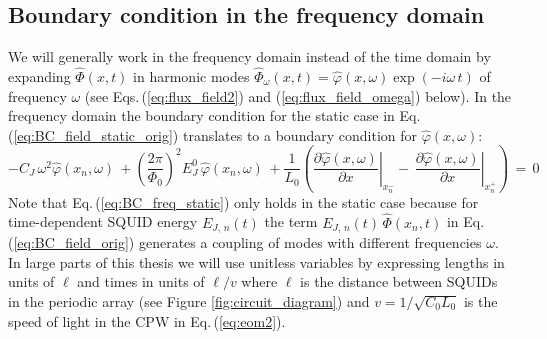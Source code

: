 \subsection{Boundary condition in the frequency domain}\label{sec:BC_in_frequency_domain}
%
\noindent
We will generally work in the frequency domain instead of the time domain by 
expanding $\hat{\Phi}(x, t)$ in harmonic modes 
$\hat{\Phi}_{\omega}(x, t) = \hat{\varphi}(x,\omega) \exp(- i \omega \, t)$ of frequency $\omega$
(see Eqs.\,(\ref{eq:flux_field2}) and (\ref{eq:flux_field_omega}) below).
In the frequency domain the boundary condition for the static case in Eq.\,(\ref{eq:BC_field_static_orig}) 
translates to a boundary condition for $\hat{\varphi}(x,\omega)$:
%
\begin{equation}\label{eq:BC_freq_static}
- C_{J} \, \omega^2 \hat{\varphi}(x_n, \omega) \, + 
\left(\frac{2 \pi}{\Phi_{0}}\right)^{2} E_J^0 \, \hat{\varphi}(x_n, \omega) \, + 
\frac{1}{L_{0}}\left(\left.\frac{\partial \hat{\varphi}(x, \omega)}{\partial x}\right|_{x_n^{-}}
- \, \left.\frac{\partial \hat{\varphi}(x,\omega)}{\partial x}\right|_{x_n^{+}}\right) \, = \, 0
\end{equation}
%
Note that Eq.\,(\ref{eq:BC_freq_static}) only holds in the static case because 
for time-dependent SQUID energy $E_{J,\,n}(t)$ the term $E_{J,\,n}(t) \, \hat{\Phi}(x_n, t)$ 
in Eq.\,(\ref{eq:BC_field_orig}) generates a coupling of modes with different frequencies $\omega$.
%
In large parts of this thesis we will use unitless variables by expressing lengths in units of $\ell$
and times in units of $\ell/v$ where $\ell$ is the distance between SQUIDs in the periodic array 
(see Figure \ref{fig:circuit_diagram})
and $v = 1 / \sqrt{C_0 L_0}$ is the speed of light in the CPW in Eq.\,(\ref{eq:eom2}).  
%
